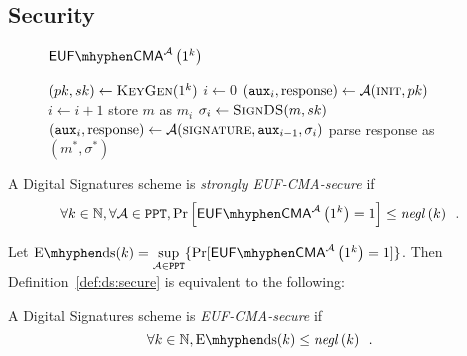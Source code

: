   \subsection{Security}
    \begin{figure}[H]
      \begin{gamebox}{$\mathsf{EUF \mhyphen CMA}^{\adversary}\left(1^k\right)$}
        \begin{algorithmic}[1]
          \State $(pk, sk) \gets \textsc{KeyGen}(1^k)$
          \State $i \gets 0$
          \State $(\mathtt{aux}_i, \mathrm{response}) \gets
          \mathcal{A}(\textsc{init}, pk)$
            \State $i \gets i + 1$
            \State store $m$ as $m_i$
            \State $\sigma_i \gets \textsc{SignDS}(m, sk)$
            \State $(\mathtt{aux}_i, \mathrm{response}) \gets
            \mathcal{A}(\textsc{signature}, \mathtt{aux}_{i-1}, \sigma_i)$
          \EndWhile
          \State parse response as $(m^*, \sigma^*)$
            \State {}
          \Else
            \State {}
          \EndIf
        \end{algorithmic}
      \end{gamebox}
      \caption{}
      \label{game:ds}
    \end{figure}
    \begin{definition}
      \label{def:ds:secure}
      A Digital Signatures scheme is \emph{strongly \textsf{EUF-CMA}-secure} if
      \begin{equation*}
        \forall k \in \mathbb{N}, \forall \adversary \in \mathtt{PPT},
        \Pr\left[\mathsf{EUF \mhyphen CMA}^{\adversary}\left(1^k\right) =
        1\right] \leq \mathit{negl}\left(k\right) \enspace.
      \end{equation*}
    \end{definition}

    Let $\mathrm{E \mhyphen ds}(k) = \underset{\adversary \in
    \mathtt{PPT}}{\sup}\{\Pr[\mathsf{EUF \mhyphen
    CMA}^{\adversary}\left(1^k\right) = 1]\}$. Then
    Definition~\ref{def:ds:secure} is equivalent to the following:

    \begin{definition}
      \label{def:ds:secure:sup}
      A Digital Signatures scheme is \emph{\textsf{EUF-CMA}-secure} if
      \begin{equation*}
        \forall k \in \mathbb{N}, \mathrm{E \mhyphen ds}(k) \leq
        \mathit{negl}\left(k\right) \enspace.
      \end{equation*}
    \end{definition}
